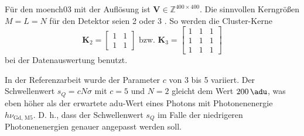 \noindent
Für den \gls{moench03} mit der Auflösung  ist $\mathbf{V} \in \mathbb{Z}^{400\times 400}$. Die sinnvollen Kerngrößen $M=L=N$ für den Detektor seien 2 oder 3 \cite[Abschnitt 4]{cartier_micron_2014}. So werden die Cluster-Kerne
\begin{equation}
    \mathbf{K}_{2} = \begin{bmatrix}
1 & 1\\
1 & 1
\end{bmatrix}
\text{ bzw. }
    \mathbf{K}_{3} = \begin{bmatrix}
1 & 1 & 1\\
1 & 1 & 1\\
1 & 1 & 1
\end{bmatrix}
\end{equation}
bei der Datenauswertung benutzt.

\noindent
In der Referenzarbeit wurde der Parameter $c$ von 3 bis 5 variiert. Der Schwellenwert $s_Q = cN\sigma$ mit $c=5$ und $N=2$ gleicht dem Wert $\SI{200}{\adu}$, was eben höher als der erwartete \gls{adu}-Wert eines Photons mit Photonenenergie $h\nu_\text{Gd, M5}$. D. h., dass der Schwellenwert $s_Q$ im Falle der niedrigeren Photonenenergien genauer angepasst werden soll.


